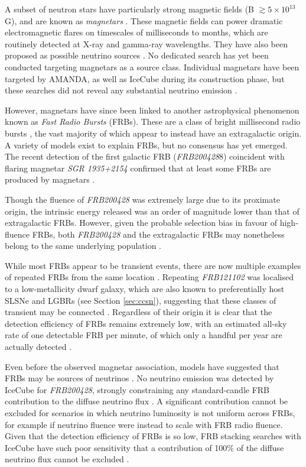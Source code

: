 A subset of neutron stars have particularly strong magnetic fields (B $\gtrsim 5 \times 10^{13}$ G), and are known as \emph{magnetars} . These magnetic fields can power dramatic electromagnetic flares on timescales of milliseconds to months, which are routinely detected at X-ray and gamma-ray wavelengths. They have also been proposed as possible neutrino sources . No dedicated search has yet been conducted targeting magnetars as a source class. Individual magnetars have been targeted by AMANDA, as well as IceCube during its construction phase, but these searches did not reveal any substantial neutrino emission .

However, magnetars have since been linked to another astrophysical phenomenon known as \emph{Fast Radio Bursts} (FRBs). These are a class of bright millisecond radio bursts , the vast majority of which appear to instead have an extragalactic origin. A variety of models exist to explain FRBs, but no consensus has yet emerged. The recent detection of the first galactic FRB (\emph{FRB200428}8) coincident with flaring magnetar \emph{SGR 1935+2154} confirmed that at least some FRBs are produced by magnetars . 

Though the fluence of \emph{FRB200428} was extremely large due to its proximate origin, the intrinsic energy released was an order of magnitude lower than that of extragalactic FRBs. However, given the probable selection bias in favour of high-fluence FRBs, both \emph{FRB200428} and the extragalactic FRBs may nonetheless belong to the same underlying population \cite{bochenek_20}.

While most FRBs appear to be transient events, there are now multiple examples of repeated FRBs from the same location . Repeating \emph{FRB121102} was localised to a low-metallicity dwarf galaxy, which are also known to preferentially host SLSNe and LGBRs (see Section \ref{sec:ccsn}), suggesting that these classes of transient may be connected . Regardless of their origin it is clear that the detection efficiency of FRBs remains extremely low, with an estimated all-sky rate of one detectable FRB per minute, of which only a handful per year are actually detected \cite{petroff_frb_19}. 

Even before the observed magnetar association, models have suggested that FRBs may be sources of neutrinos . No neutrino emission was detected by IceCube for \emph{FRB200428}, strongly constraining any standard-candle FRB contribution to the diffuse neutrino flux . A significant contribution cannot be excluded for scenarios in which neutrino luminosity is not uniform across FRBs, for example if neutrino fluence were instead to scale with FRB radio fluence. Given that the detection efficiency of FRBs is so low, FRB stacking searches with IceCube have such poor sensitivity that a contribution of 100\% of the diffuse neutrino flux cannot be excluded .

